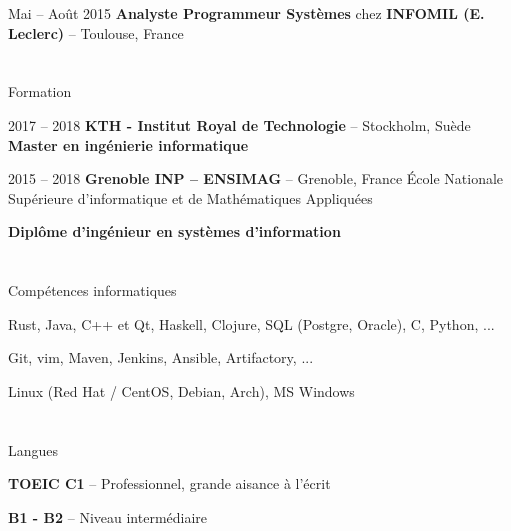 \documentclass[a4paper, 10pt]{article}
\begin{document}
\begin{datedEntry}
    {Mai -- Août 2015}
    {\textbf{Analyste Programmeur Systèmes} chez \textbf{INFOMIL (E. Leclerc)} -- Toulouse, France}
\end{datedEntry}


\section{\faGraduationCap}{Formation}

\begin{datedEntry}
    {2017 -- 2018}
    {\textbf{KTH - Institut Royal de Technologie} -- Stockholm, Suède}
    \textbf{Master en ingénierie informatique}

    \smallskip
\end{datedEntry}

\begin{datedEntry}
    {2015 -- 2018}
    {\textbf{Grenoble INP -- ENSIMAG} -- Grenoble, France}
    École Nationale Supérieure d'informatique et de Mathématiques Appliquées

    \smallskip
    \textbf{Diplôme d'ingénieur en systèmes d'information}
\end{datedEntry}


\section{\faLaptop}{Compétences informatiques}

{Rust, Java, C++ et Qt, Haskell, Clojure, SQL (Postgre, Oracle), C, Python, ...}

{Git, vim, Maven, Jenkins, Ansible, Artifactory, ...}

{Linux (Red Hat / CentOS, Debian, Arch), MS Windows}


\section{\faComment[regular]}{Langues}


{\textbf{TOEIC C1} -- Professionnel, grande aisance à l'écrit}

{\textbf{B1 - B2} -- Niveau intermédiaire}
\end{document}
